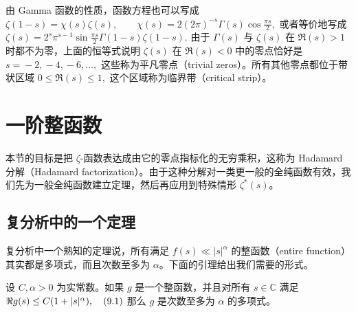 \begin{remark}
	由 Gamma 函数的性质，函数方程也可以写成
	\(\textstyle \zeta(1-s)=\allowbreak{}\chi(s)\zeta(s),\allowbreak{} \qquad \chi(s)=\allowbreak{}2(2\pi)^{-s}\Gamma(s)\cos\frac{\pi s}{2},\allowbreak{}\)
	或者等价地写成
	\(\textstyle \zeta(s) =\allowbreak{} 2^s\pi^{s-1}\sin\frac{\pi s}{2}\Gamma(1-s)\zeta(1-s).\)
	由于 $\Gamma(s)$ 与 $\zeta(s)$ 在 $\Re(s)>1$ 时都不为零，上面的恒等式说明 $\zeta(s)$ 在 $\Re(s)<0$ 中的零点恰好是
	\(\textstyle s=\allowbreak{}-2,\allowbreak{}-4,\allowbreak{}-6,\allowbreak{}\ldots,\allowbreak{}\)
	这些称为平凡零点（trivial zeros）。所有其他零点都位于带状区域
	\(\textstyle 0\leq\allowbreak{} \Re(s)\leq\allowbreak{} 1,\allowbreak{}\)
	这个区域称为临界带（critical strip）。
\end{remark}

\section{一阶整函数}

本节的目标是把 $\zeta$-函数表达成由它的零点指标化的无穷乘积，这称为 Hadamard 分解（Hadamard factorization）。由于这种分解对一类更一般的全纯函数有效，我们先为一般全纯函数建立定理，然后再应用到特殊情形 $\zeta^*(s)$。

\subsection{复分析中的一个定理}

复分析中一个熟知的定理说，所有满足
\(\textstyle f(s)\ll\allowbreak{} |s|^\alpha\)
的整函数（entire function）其实都是多项式，而且次数至多为 $\alpha$。下面的引理给出我们需要的形式。

\begin{lemma}[原文 Lemma 9.1]
	设 $C,\alpha>0$ 为实常数。如果 $g$ 是一个整函数，并且对所有 $s\in\mathbb C$ 满足
	\(\textstyle \Re g(s)\leq\allowbreak{} C(1+\allowbreak{}|s|^\alpha),\allowbreak{} \quad\textup{(9.1)}\)
	那么 $g$ 是次数至多为 $\alpha$ 的多项式。
\end{lemma}

